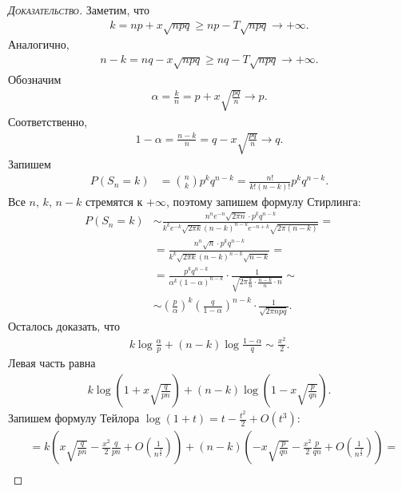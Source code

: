 \begin{proof}[\normalfont\textsc{Доказательство}]
 Заметим, что
 \begin{align*}
  k = np + x \sqrt{npq} \geqslant np - T \sqrt{npq} \to +\infty.
 \end{align*} Аналогично,
 \begin{align*}
  n - k = nq - x \sqrt{npq} \geqslant nq - T \sqrt{npq} \to +\infty
 .\end{align*} Обозначим
 \begin{align*}
  \alpha = \frac{k}{n} = p + x\sqrt{\frac{pq}{n}} \to p
 .\end{align*} Соответственно,
 \begin{align*}
  1 - \alpha = \frac{n - k}{n} = q - x \sqrt{\frac{pq}{n}} \to q.
 \end{align*} Запишем
 \begin{align*}
  P(S_n = k) &= \binom n k p^{k}q^{n-k} = \frac{n!}{k!(n-k)!} p^{k}q^{n-k}.
 \end{align*} Все $n$, $k$, $n - k$ стремятся к  $+\infty$, поэтому запишем формулу Стирлинга:
 \begin{align*}
  P(S_n = k) &\sim \frac{n^{n}e^{-n}\sqrt{2\pi n} \cdot p^{k}q^{n-k}}{k^{k}e^{-k}\sqrt{2\pi k}(n-k)^{n-k}e^{-n+k}\sqrt{2\pi (n-k)}} = \\
  &= \frac{n^{n}\sqrt{n} \cdot p^{k}q^{n-k}}{k^{k}\sqrt{2\pi k}(n-k)^{n-k} \sqrt{n-k}} = \\
  &= \frac{p^{k}q^{n-k}}{\alpha^{k}(1 - \alpha)^{n-k}} \cdot \frac{1}{\sqrt{2 \pi \frac{k}{n} \cdot \frac{n-k}{n} \cdot n}} \sim \\
  &\sim \left(\frac{p}{\alpha}\right)^{k} \left( \frac{q}{1 - \alpha} \right)^{n-k} \cdot \frac{1}{\sqrt{2 \pi npq}}
 .\end{align*} Осталось доказать, что
 \begin{align*}
  k \log \frac{\alpha}{p} + (n-k) \log \frac{1 - \alpha}{q} \sim \frac{x^{2}}{2}
 .\end{align*} Левая часть равна
 \begin{align*}
  k \log\left(1 + x \sqrt{\frac{q}{pn}}\right) + (n-k)\log \left( 1 - x \sqrt{\frac{p}{qn}} \right).
 \end{align*} Запишем формулу Тейлора $\log(1 + t) = t - \frac{t^{2}}{2} + O(t^{3})$:
 \begin{align*}
  &= k \left(x \sqrt{\frac{q}{pn}} - \frac{x^{2}}{2} \frac{q}{pn} + O\left(\frac{1}{n^{\frac{3}{2}}}\right)\right) + (n-k) \left( -x \sqrt{\frac{p}{qn}}  - \frac{x^{2}}{2} \frac{p}{qn} + O \left( \frac{1}{n^{\frac{3}{2}}} \right) \right) = \\

\end{align*}
\end{proof}
